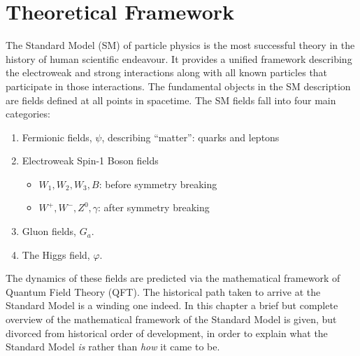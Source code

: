 \graphicspath{{Ch1_Theory/figures/}}

\chapter{Theoretical Framework}

The Standard Model (SM) of particle physics is the most successful theory in the history of human scientific endeavour.
It provides a unified framework describing the electroweak and strong interactions along with all known particles that participate in those interactions.
The fundamental objects in the SM description are fields defined at all points in spacetime.
The SM fields fall into four main categories:


\begin{enumerate}
    \item Fermionic fields, $\psi$, describing ``matter'': quarks and leptons
    \item Electroweak Spin-1 Boson fields
        \begin{itemize}
            \item $W_1, W_2, W_3, B$: before symmetry breaking
            \item $W^+, W^-, Z^0, \gamma$: after symmetry breaking
        \end{itemize}
    \item Gluon fields, $G_a$.
    \item The Higgs field, $\varphi$.
\end{enumerate}

The dynamics of these fields are predicted via the mathematical framework of Quantum Field Theory (QFT).
The historical path taken to arrive at the Standard Model is a winding one indeed.
In this chapter a brief but complete overview of the mathematical framework of the Standard Model is given, but divorced from historical order of development, in order to explain what the Standard Model \textit{is} rather than \textit{how} it came to be.

